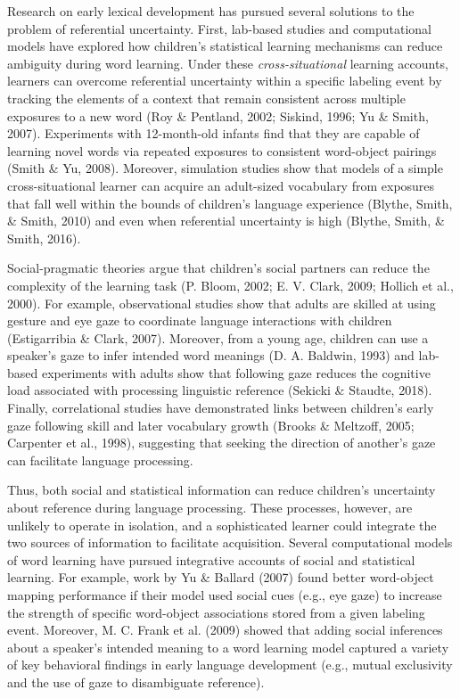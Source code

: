 \documentclass[oneside]{report}
\begin{document}
Research on early lexical development has pursued several solutions to
the problem of referential uncertainty. First, lab-based studies and
computational models have explored how children's statistical learning
mechanisms can reduce ambiguity during word learning. Under these
\emph{cross-situational} learning accounts, learners can overcome
referential uncertainty within a specific labeling event by tracking the
elements of a context that remain consistent across multiple exposures
to a new word (Roy \& Pentland, 2002; Siskind, 1996; Yu \& Smith, 2007).
Experiments with 12-month-old infants find that they are capable of
learning novel words via repeated exposures to consistent word-object
pairings (Smith \& Yu, 2008). Moreover, simulation studies show that
models of a simple cross-situational learner can acquire an adult-sized
vocabulary from exposures that fall well within the bounds of children's
language experience (Blythe, Smith, \& Smith, 2010) and even when
referential uncertainty is high (Blythe, Smith, \& Smith, 2016).

Social-pragmatic theories argue that children's social partners can
reduce the complexity of the learning task (P. Bloom, 2002; E. V. Clark,
2009; Hollich et al., 2000). For example, observational studies show
that adults are skilled at using gesture and eye gaze to coordinate
language interactions with children (Estigarribia \& Clark, 2007).
Moreover, from a young age, children can use a speaker's gaze to infer
intended word meanings (D. A. Baldwin, 1993) and lab-based experiments
with adults show that following gaze reduces the cognitive load
associated with processing linguistic reference (Sekicki \& Staudte,
2018). Finally, correlational studies have demonstrated links between
children's early gaze following skill and later vocabulary growth
(Brooks \& Meltzoff, 2005; Carpenter et al., 1998), suggesting that
seeking the direction of another's gaze can facilitate language
processing.

Thus, both social and statistical information can reduce children's
uncertainty about reference during language processing. These processes,
however, are unlikely to operate in isolation, and a sophisticated
learner could integrate the two sources of information to facilitate
acquisition. Several computational models of word learning have pursued
integrative accounts of social and statistical learning. For example,
work by Yu \& Ballard (2007) found better word-object mapping
performance if their model used social cues (e.g., eye gaze) to increase
the strength of specific word-object associations stored from a given
labeling event. Moreover, M. C. Frank et al. (2009) showed that adding
social inferences about a speaker's intended meaning to a word learning
model captured a variety of key behavioral findings in early language
development (e.g., mutual exclusivity and the use of gaze to
disambiguate reference).
\end{document}
